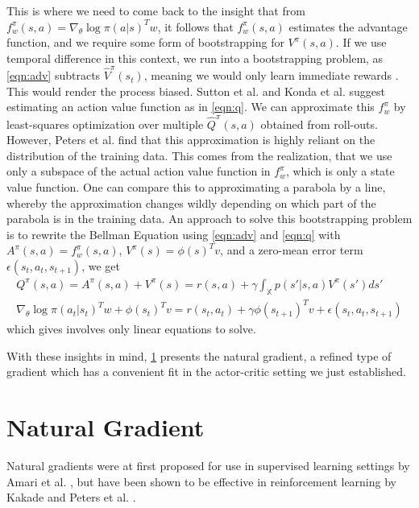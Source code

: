 This is where we need to come back to the insight that from $f_w^\pi(s,a) = {\nabla_\theta \log\pi(a|s)}^T w$, it follows that $f_w^\pi(s,a)$ estimates the advantage function, and we require some form of bootstrapping for $V^\pi(s,a)$. If we use temporal difference in this context, we run into a bootstrapping problem, as \eqref{eqn:adv} subtracts $\hat{V}^\pi(s_t)$, meaning we would only learn immediate rewards \cite{Peters_IICHR_2003}. This would render the process biased. Sutton et al. \cite{Sutton:1999:PGM:3009657.3009806} and Konda et al. \cite{NIPS1999_1786} suggest estimating an action value function as in \eqref{eqn:q}. We can approximate this $f_w^\pi$ by least-squares optimization over multiple $\hat{Q}^\pi(s,a)$ obtained from roll-outs. However, Peters et al. \cite{4863} find that this approximation is highly reliant on the distribution of the training data. This comes from the realization, that we use only a subspace of the actual action value function in $f_w^\pi$, which is only a state value function. One can compare this to approximating a parabola by a line, whereby the approximation changes wildly depending on which part of the parabola is in the training data. An approach to solve this bootstrapping problem is to rewrite the Bellman Equation using \eqref{eqn:adv} and \eqref{eqn:q} with $A^\pi(s,a) = f_w^\pi(s,a)$, $V^\pi(s) = \phi(s)^T v$, and a zero-mean error term $\epsilon(s_t,a_t,s_{t+1})$, we get
\begin{align}
  Q^\pi(s,a) = A^\pi(s,a) + V^\pi(s) = r(s,a) + \gamma \int_\mathbb{X} p(s'|s,a)V^\pi(s')ds' \\
  \nabla_\theta \log \pi(a_t|s_t)^T w + \phi(s_t)^T v = r(s_t,a_t) + \gamma \phi(s_{t+1})^T v + \epsilon(s_t,a_t,s_{t+1})
\end{align}
which gives involves only linear equations to solve. \cite{4863} 

With these insights in mind, \ref{sec:natural} presents the natural gradient, a refined type of gradient which has a convenient fit in the actor-critic setting we just established.

\section{Natural Gradient}
\label{sec:natural}

Natural gradients were at first proposed for use in supervised learning settings by Amari et al. \cite{Amari:1998:NGW:287476.287477}, but have been shown to be effective in reinforcement learning by Kakade \cite{Kakade:2001} and Peters et al. \cite{4863}.

